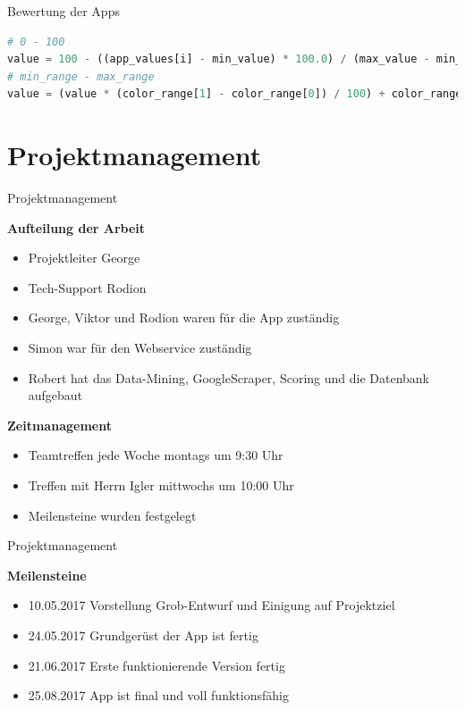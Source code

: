 \documentclass[compress,t]{beamer}
\begin{document}
\begin{frame}[fragile]{Bewertung der Apps}
    \begin{lstlisting}[language=Python]
# 0 - 100
value = 100 - ((app_values[i] - min_value) * 100.0) / (max_value - min_value)
# min_range - max_range
value = (value * (color_range[1] - color_range[0]) / 100) + color_range[0]
    \end{lstlisting}

\end{frame}

\section{Projektmanagement}

\begin{frame}{Projektmanagement}


    \textbf{Aufteilung der Arbeit}
     \begin{itemize}
          \item Projektleiter George
          \item Tech-Support Rodion
          \item George, Viktor und Rodion waren für die App zuständig
          \item Simon war für den Webservice zuständig
          \item Robert hat das Data-Mining, GoogleScraper, Scoring und die Datenbank aufgebaut
     \end{itemize}
    \textbf{Zeitmanagement}
        \begin{itemize}
          \item Teamtreffen jede Woche montags um 9:30 Uhr
          \item Treffen mit Herrn Igler mittwochs um 10:00 Uhr
          \item Meilensteine wurden festgelegt
        \end{itemize}

\end{frame}
\begin{frame}{Projektmanagement}

    \textbf{Meilensteine}
     \begin{itemize}
          \item 10.05.2017 Vorstellung Grob-Entwurf und Einigung auf Projektziel
          \item 24.05.2017 Grundgerüst der App ist fertig
          \item 21.06.2017 Erste funktionierende Version fertig
          \item 25.08.2017 App ist final und voll funktionsfähig
    \end{itemize}

\end{frame}
\end{document}
